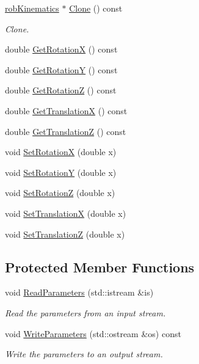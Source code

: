 \begin{DoxyCompactItemize}
\hyperlink{classrob_kinematics}{rob\+Kinematics} $\ast$ \hyperlink{classrob_hayati_a46b84e898c3df017074375c90cdac82b}{Clone} () const 
\begin{DoxyCompactList}\small\item\em Clone. \end{DoxyCompactList}\item 
double \hyperlink{classrob_hayati_abcb2d68f6a161ecccf9e6f725c8d721b}{Get\+Rotation\+X} () const 
\item 
double \hyperlink{classrob_hayati_af25da131e0690827aafe17dc3044ff7d}{Get\+Rotation\+Y} () const 
\item 
double \hyperlink{classrob_hayati_a639cec9c8b24de6a5d8fe9d5872712a0}{Get\+Rotation\+Z} () const 
\item 
double \hyperlink{classrob_hayati_aa84ace6d8c38ca6d5c6273b6a4f86b75}{Get\+Translation\+X} () const 
\item 
double \hyperlink{classrob_hayati_aaee5dcaf63efab3a3fd477853cceac66}{Get\+Translation\+Z} () const 
\item 
void \hyperlink{classrob_hayati_abf99a19942aaa3f27abf26589a25609a}{Set\+Rotation\+X} (double x)
\item 
void \hyperlink{classrob_hayati_ae6c0af41ad2469f6879923cbbb77f025}{Set\+Rotation\+Y} (double x)
\item 
void \hyperlink{classrob_hayati_a74f15dc16b8c10f1f4ef9722ce9715d5}{Set\+Rotation\+Z} (double x)
\item 
void \hyperlink{classrob_hayati_a52a475c5bfc90a9e0c72a3283bbbf23e}{Set\+Translation\+X} (double x)
\item 
void \hyperlink{classrob_hayati_a90c7af4c2a0e6211f2aaac1171f97310}{Set\+Translation\+Z} (double x)
\end{DoxyCompactItemize}
\subsection*{Protected Member Functions}
\begin{DoxyCompactItemize}
\item 
void \hyperlink{classrob_hayati_affd3856ec8770008d0757ddc1f9ce40d}{Read\+Parameters} (std\+::istream \&is)
\begin{DoxyCompactList}\small\item\em Read the parameters from an input stream. \end{DoxyCompactList}\item 
void \hyperlink{classrob_hayati_afe4cc7030ab2d8a249269afc4b7822c9}{Write\+Parameters} (std\+::ostream \&os) const 
\begin{DoxyCompactList}\small\item\em Write the parameters to an output stream. \end{DoxyCompactList}\end{DoxyCompactItemize}
